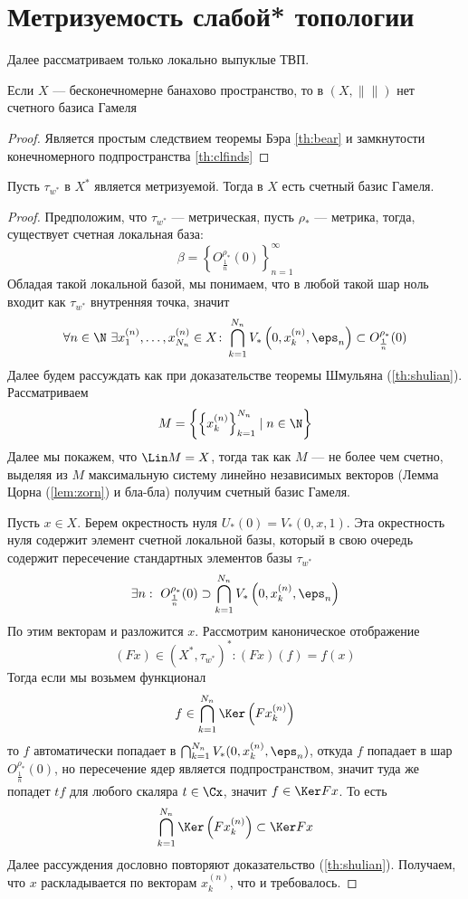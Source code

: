 \newpage
\section{Метризуемость слабой* топологии}
Далее рассматриваем только локально выпуклые ТВП. 


\begin{claim}[воспоминание]
	Если $X$ --- бесконечномерне банахово пространство, то в $(X, \|\|)$ нет счетного базиса Гамеля
\end{claim}
\begin{proof}
	Является простым следствием теоремы Бэра \ref{th:bear} и замкнутости конечномерного подпространства \ref{th:clfinds}
\end{proof}
\begin{claim}
	Пусть $\tau_{w^*}$ в $X^*$ является метризуемой. Тогда в $X$ есть счетный базис Гамеля.
\end{claim}
\begin{proof}
	Предположим, что $\tau_{w^*}$ --- метрическая, пусть $\rho_*$ --- метрика, тогда, существует счетная локальная база:
	$$
	\beta = \left\{O_{\frac{1}{n}}^{\rho_*}(0)\right\}_{n = 1}^\infty
	$$
	Обладая такой локальной базой, мы понимаем, что в любой такой шар ноль входит как $\tau_{w^*}$ внутренняя точка, значит 
	$$
	\forall n \in \N \ \exists x^{(n)}_1, \dots, x^{(n)}_{N_n} \in X \colon \bigcap_{k = 1}^{N_n} V_*\left(0, x_k^{(n)}, \eps_n\right)\subset O_{\frac{1}{n}}^{\rho_*}(0)
	$$
	Далее будем рассуждать как при доказательстве теоремы Шмульяна (\ref{th:shulian}). Рассматриваем 
	$$
	M = \left\{\left\{x_k^{(n)}\right\}_{k=1}^{N_n} \mid n \in \N\right\}
	$$
	Далее мы покажем, что $\Lin M = X$, тогда так как $M$ --- не более чем счетно, выделяя из $M$ максимальную систему линейно независимых векторов (Лемма Цорна (\ref{lem:zorn}) и бла-бла) получим счетный базис Гамеля. 
	
	Пусть $x \in X$. Берем окрестность нуля $U_*(0) = V_*(0,x,1)$. Эта окрестность нуля содержит элемент счетной локальной базы, который в свою очередь содержит пересечение стандартных элементов базы $\tau_{w^*}$
	$$
	\exists n: \  O_{\frac{1}{n}}^{\rho_*}(0) \supset \bigcap_{k = 1}^{N_n} V_*\left(0, x_k^{(n)}, \eps_n\right)
	$$
	По этим векторам и разложится $x$. Рассмотрим каноническое отображение 
	$$(Fx) \in (X^*, \tau_{w^*})^*\colon (Fx)(f) = f(x)$$
	Тогда если мы возьмем функционал 
	$$
	f \in \bigcap_{k=1}^{N_n} \Ker \left(Fx_k^{(n)}\right)
	$$
	то $f$ автоматически попадает в $\bigcap_{k = 1}^{N_n} V_*(0, x_k^{(n)}, \eps_n)$, откуда $f$ попадает в шар $O_{\frac{1}{n}}^{\rho_*}(0)$, но пересечение ядер является подпространством, значит туда же попадет $t f$ для любого скаляра $t \in \Cx$, значит $f \in \Ker Fx$. То есть 
	$$
	 \bigcap_{k=1}^{N_n} \Ker \left(Fx_k^{(n)}\right) \subset \Ker Fx
	$$
	Далее рассуждения дословно повторяют доказательство (\ref{th:shulian}). Получаем, что $x$ раскладывается по векторам $x_{k}^{(n)}$, что и требовалось.
\end{proof}
